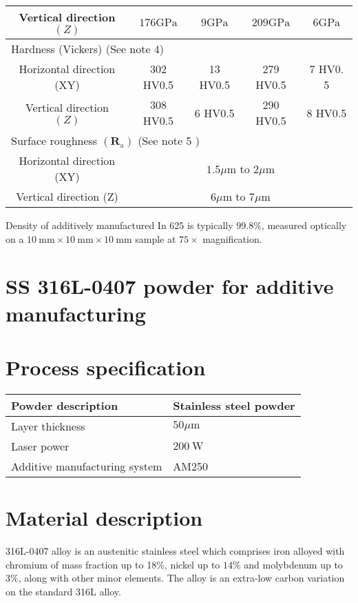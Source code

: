 \documentclass[10pt]{article}
\begin{document}
\begin{center}
\begin{tabular}{|c|c|c|c|c|}
\hline
Vertical direction $(Z)$ & $176 \mathrm{GPa}$ & $9 \mathrm{GPa}$ & $209 \mathrm{GPa}$ & $6 \mathrm{GPa}$ \\
\hline
\multicolumn{5}{|l|}{Hardness (Vickers) (See note 4)} \\
\hline
Horizontal direction (XY) & 302 HV0.5 & 13 HV0.5 & 279 HV0.5 & 7 HV0. 5 \\
\hline
Vertical direction $(Z)$ & 308 HV0.5 & 6 HV0.5 & 290 HV0.5 & 8 HV0.5 \\
\hline
\multicolumn{5}{|l|}{Surface roughness $\left(\mathbf{R}_{\mathrm{a}}\right)$ (See note 5 )} \\
\hline
Horizontal direction (XY) & \multicolumn{4}{|c|}{$1.5 \mu \mathrm{m}$ to $2 \mu \mathrm{m}$} \\
\hline
Vertical direction (Z) & \multicolumn{4}{|c|}{$6 \mu \mathrm{m}$ to $7 \mu \mathrm{m}$} \\
\hline
\end{tabular}
\end{center}

Density of additively manufactured In 625 is typically $99.8 \%$, measured optically on a $10 \mathrm{~mm} \times 10 \mathrm{~mm} \times 10 \mathrm{~mm}$ sample at $75 \times$ magnification.

\section*{SS 316L-0407 powder for additive manufacturing}
\section*{Process specification}
\begin{center}
\begin{tabular}{|l|l|}
\hline
Powder description & Stainless steel powder \\
\hline
Layer thickness & $50 \mu \mathrm{m}$ \\
\hline
Laser power & $200 \mathrm{~W}$ \\
\hline
Additive manufacturing system & AM250 \\
\hline
\end{tabular}
\end{center}

\section*{Material description}
316L-0407 alloy is an austenitic stainless steel which comprises iron alloyed with chromium of mass fraction up to 18\%, nickel up to $14 \%$ and molybdenum up to $3 \%$, along with other minor elements. The alloy is an extra-low carbon variation on the standard 316L alloy.
\end{document}
